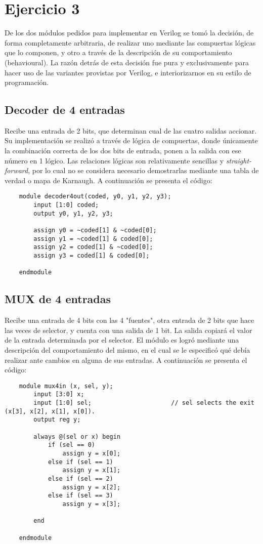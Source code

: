 \section{Ejercicio 3}
De los dos módulos pedidos para implementar en Verilog se tomó la decisión, de forma completamente arbitraria, de realizar uno mediante las compuertas lógicas que lo componen, y otro a través de la descripción de su comportamiento (behavioural).
La razón detrás de esta decisión fue pura y exclusivamente para hacer uso de las variantes provistas por Verilog, e interiorizarnos en su estilo de programación.

\subsection{Decoder de 4 entradas}
Recibe una entrada de 2 bits, que determinan cual de las cuatro salidas accionar.
Su implementación se realizó a través de lógica de compuertas, donde únicamente la combinación correcta de los dos bits de entrada, ponen a la salida con ese número en 1 lógico.
Las relaciones lógicas son relativamente sencillas y \textit{straight-forward}, por lo cual no se considera necesario demostrarlas mediante una tabla de verdad o mapa de Karnaugh.
A continuación se presenta el código:
\begin{lstlisting}
    module decoder4out(coded, y0, y1, y2, y3);
        input [1:0] coded;
        output y0, y1, y2, y3;

        assign y0 = ~coded[1] & ~coded[0];
        assign y1 = ~coded[1] & coded[0];
        assign y2 = coded[1] & ~coded[0];
        assign y3 = coded[1] & coded[0];

    endmodule
\end{lstlisting}

\subsection{MUX de 4 entradas}
Recibe una entrada de 4 bits con las 4 "fuentes", otra entrada de 2 bits que hace las veces de selector, y cuenta con una salida de 1 bit.
La salida copiará el valor de la entrada determinada por el selector.
El módulo es logró mediante una descripción del comportamiento del mismo, en el cual se le especificó qué debía realizar ante cambios en alguna de sus entradas.
A continuación se presenta el código:
\begin{lstlisting}
    module mux4in (x, sel, y);
        input [3:0] x;
        input [1:0] sel;                      // sel selects the exit (x[3], x[2], x[1], x[0]).
        output reg y;

        always @(sel or x) begin
            if (sel == 0)
                assign y = x[0];
            else if (sel == 1)
                assign y = x[1];
            else if (sel == 2)
                assign y = x[2];
            else if (sel == 3)
                assign y = x[3];

        end

    endmodule
\end{lstlisting}

